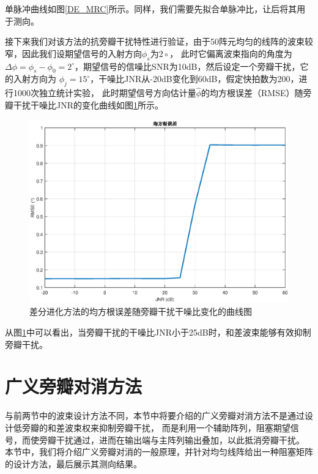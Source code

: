 \documentclass[master]{thesis-uestc}
\begin{document}
单脉冲曲线如图\ref{DE_MRC}所示。同样，我们需要先拟合单脉冲比，让后将其用于测向。

接下来我们对该方法的抗旁瓣干扰特性进行验证，由于50阵元均匀的线阵的波束较窄，因此我们设期望信号的入射方向$\phi_s$为$2\circ$，
此时它偏离波束指向的角度为$\Delta\phi=\phi_s-\phi_0=2^\circ$，期望信号的信噪比SNR为10dB，然后设定一个旁瓣干扰，它的入射方向为
$\phi_j=15^\circ$，干噪比JNR从-20dB变化到60dB，假定快拍数为200，进行1000次独立统计实验，
此时期望信号方向估计量$\hat{\phi}$的均方根误差（RMSE）随旁瓣干扰干噪比JNR的变化曲线如图\ref{DR_RMSE_JNR}所示。
\begin{figure}[H]
    \includegraphics[scale=0.5]{pic/DR_RMSE_JNR.eps}
    \caption{差分进化方法的均方根误差随旁瓣干扰干噪比变化的曲线图}
    \label{DR_RMSE_JNR}
\end{figure}

从图\ref{DR_RMSE_JNR}中可以看出，当旁瓣干扰的干噪比JNR小于25dB时，和差波束能够有效抑制旁瓣干扰。

\section{广义旁瓣对消方法}
与前两节中的波束设计方法不同，本节中将要介绍的广义旁瓣对消方法不是通过设计低旁瓣的和差波束权来抑制旁瓣干扰，
而是利用一个辅助阵列，阻塞期望信号，而使旁瓣干扰通过，进而在输出端与主阵列输出叠加，以此抵消旁瓣干扰。
本节中，我们将介绍广义旁瓣对消的一般原理，并针对均匀线阵给出一种阻塞矩阵的设计方法，最后展示其测向结果。
\end{document}
